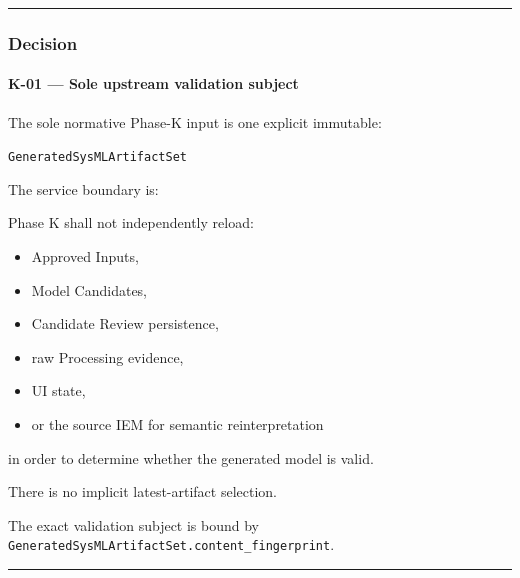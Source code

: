 \begin{center}\rule{0.5\linewidth}{0.5pt}\end{center}

\hypertarget{decision-7}{%
\subsubsection{Decision}\label{decision-7}}

\hypertarget{k-01--sole-upstream-validation-subject}{%
\paragraph{K-01 --- Sole upstream validation subject}\label{k-01--sole-upstream-validation-subject}}

The sole normative Phase-K input is one explicit immutable:

\texttt{GeneratedSysMLArtifactSet}

The service boundary is:

\begin{Shaded}
\begin{Highlighting}[]
\NormalTok{) }\OperatorTok{{-}\textgreater{}}
\end{Highlighting}
\end{Shaded}

Phase K shall not independently reload:

\begin{itemize}
\tightlist
\item
  Approved Inputs,
\item
  Model Candidates,
\item
  Candidate Review persistence,
\item
  raw Processing evidence,
\item
  UI state,
\item
  or the source IEM for semantic reinterpretation
\end{itemize}

in order to determine whether the generated model is valid.

There is no implicit latest-artifact selection.

The exact validation subject is bound by \texttt{GeneratedSysMLArtifactSet.content\_fingerprint}.

\begin{center}\rule{0.5\linewidth}{0.5pt}\end{center}

